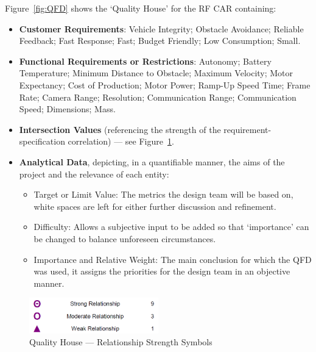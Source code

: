 Figure~\ref{fig:QFD} shows the `Quality House' for the RF CAR containing:
\begin{itemize}
\item \textbf{Customer Requirements}: Vehicle Integrity; Obstacle Avoidance; Reliable Feedback; Fast Response; Fast; Budget Friendly; Low Consumption; Small.
\item \textbf{Functional Requirements or Restrictions}: Autonomy; Battery Temperature; Minimum Distance to Obstacle; Maximum Velocity; Motor Expectancy; Cost of Production; Motor Power; Ramp-Up Speed Time; Frame Rate; Camera Range; Resolution; Communication Range; Communication Speed; Dimensions; Mass.
\item \textbf{Intersection Values} (referencing the strength of the requirement-specification correlation) --- see Figure~\ref{fig:QFD-R}.
\item \textbf{Analytical Data}, depicting, in a quantifiable manner, the aims of the project and the relevance of each
  entity:
  \begin{itemize}
  \item Target or Limit Value: The metrics the design team will be based on, white spaces are left for either further discussion and refinement.
  \item Difficulty: Allows a subjective input to be added so that `importance' can be changed to balance unforeseen circumstances.
  \item Importance and Relative Weight: The main conclusion for which the QFD was used, it assigns the priorities for the design team in an objective manner.
  \end{itemize}
\end{itemize}
%
\begin{figure}[!htbp]
   \centering
       \includegraphics[page=1,width=0.5\textwidth]{sec/img/Relationship_Symbols.png} 
 \caption{Quality House --- Relationship Strength Symbols}%
\label{fig:QFD-R}
\end{figure}
%
